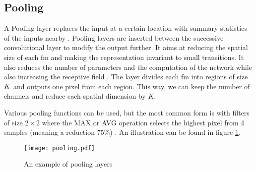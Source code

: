 \subsection{Pooling} \label{subs:pooling}
A Pooling layer replaces the input at a certain location with summary statistics of the inputs nearby \cite{goodfellow_deep_2016}. Pooling layers are inserted between the successive convolutional layer to modify the output further. It aims at reducing the spatial size of each \acrshort{fm} and making the representation invariant to small transitions. It also reduces the number of parameters and the computation of the network while also increasing the receptive field \cite{shawahna_fpga-based_2019}. The layer divides each \acrshort{fm} into regions of size $K \title K$ and outputs one pixel from each region. This way, we can keep the number of channels and reduce each spatial dimension by $K$.

Various pooling functions can be used, but the most common form is with filters of size $2 \times 2$ where the MAX or AVG operation selects the highest pixel from 4 samples (meaning a reduction 75\%) \cite{suda_throughput-optimized_2016}. An illustration can be found in figure \ref{fig:pool}.
%
\begin{figure}
    \centering
    \texttt{[image: pooling.pdf]}
    \caption{An example of pooling layers}
    \label{fig:pool}
\end{figure}
